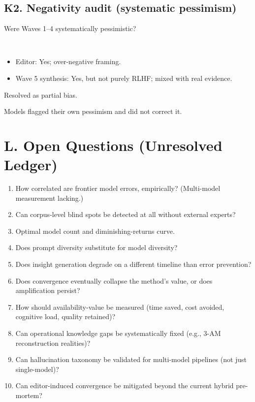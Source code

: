 \documentclass[11pt,letterpaper]{article}
\begin{document}
\subsection{K2. Negativity audit (systematic pessimism)}

\begin{reflist}
\item[Dispute:] Were Waves 1--4 systematically pessimistic?
\item[Positions:]~
  \begin{itemize}[nosep]
    \item Editor: Yes; over-negative framing.
    \item Wave 5 synthesis: Yes, but not purely RLHF; mixed with real evidence.
  \end{itemize}
\item[Status:] Resolved as partial bias.
\item[Evidence:] Models flagged their own pessimism and did not correct it.
\end{reflist}

\section{L. Open Questions (Unresolved Ledger)}

\begin{enumerate}[nosep]
  \item How correlated are frontier model errors, empirically? (Multi-model measurement lacking.)
  \item Can corpus-level blind spots be detected at all without external experts?
  \item Optimal model count and diminishing-returns curve.
  \item Does prompt diversity substitute for model diversity?
  \item Does insight generation degrade on a different timeline than error prevention?
  \item Does convergence eventually collapse the method's value, or does amplification persist?
  \item How should availability-value be measured (time saved, cost avoided, cognitive load, quality retained)?
  \item Can operational knowledge gaps be systematically fixed (e.g., 3-AM reconstruction realities)?
  \item Can hallucination taxonomy be validated for multi-model pipelines (not just single-model)?
  \item Can editor-induced convergence be mitigated beyond the current hybrid pre-mortem?
\end{enumerate}
\end{document}
